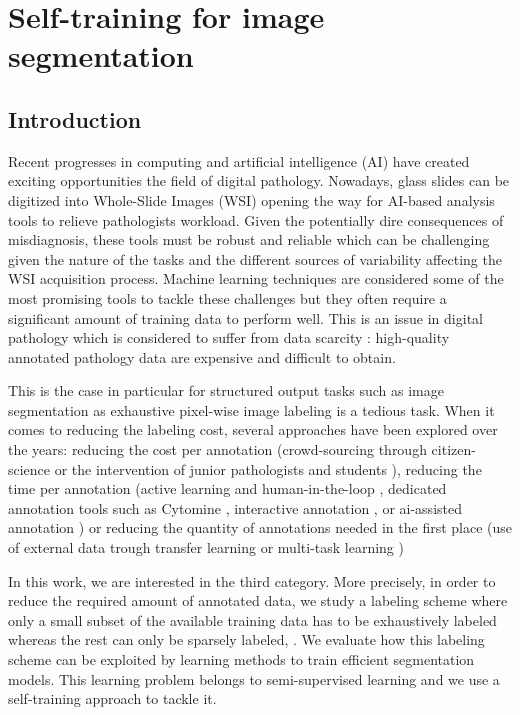\chapter{Self-training for image segmentation}
\label{chap:strain}

\section{Introduction}
\label{sec:strain:intro}

Recent progresses in computing and artificial intelligence (AI) have created exciting opportunities the field of digital pathology. Nowadays, glass slides can be digitized into Whole-Slide Images (WSI) opening the way for AI-based analysis tools to relieve pathologists workload. Given the potentially dire consequences of misdiagnosis, these tools must be robust and reliable which can be challenging given the nature of the tasks and the different sources of variability affecting the WSI acquisition process. Machine learning techniques are considered some of the most promising tools to tackle these challenges but they often require a significant amount of training data to perform well. This is an issue in digital pathology which is considered to suffer from data scarcity \parencite{tizhoosh2018artificial, litjens2017survey}: high-quality annotated pathology data are expensive and difficult to obtain. 

This is the case in particular for structured output tasks such as image segmentation as exhaustive pixel-wise image labeling is a tedious task. When it comes to reducing the labeling cost, several approaches have been explored over the years: reducing the cost per annotation (\eg crowd-sourcing through citizen-science \parencite{peplow2016citizen} or the intervention of junior pathologists and students \parencite{amgad2021nucls}), reducing the time per annotation (\eg active learning and human-in-the-loop \parencite{chai2020human}, dedicated annotation tools such as Cytomine \parencite{maree2016collaborative}, interactive annotation \parencite{berg2019}, or ai-assisted annotation \parencite{amgad2021nucls, graham2021conic, aubreville2021mitosis}) or reducing the quantity of annotations needed in the first place (\eg use of external data trough transfer learning \parencite{mormont2018comparison} or multi-task learning \parencite{mormont2020multi})

In this work, we are interested in the third category. More precisely, in order to reduce the required amount of annotated data, we study a labeling scheme where only a small subset of the available training data has to be exhaustively labeled whereas the rest can only be sparsely labeled, .  We evaluate how this labeling scheme can be exploited by learning methods to train efficient segmentation models. This learning problem belongs to semi-supervised learning and we use a self-training approach to tackle it.

